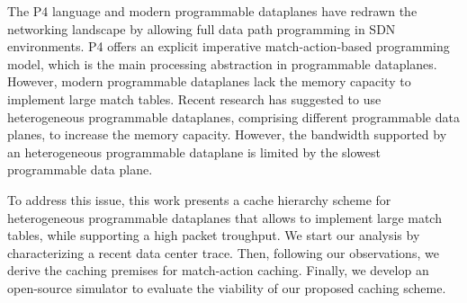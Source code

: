 The P4 language and modern programmable dataplanes have redrawn the networking landscape by allowing full data path programming in SDN environments.
P4 offers an explicit imperative match-action-based programming model, which is the main processing abstraction in programmable dataplanes.
However, modern programmable dataplanes lack the memory capacity to implement large match tables.
Recent research has suggested to use heterogeneous programmable dataplanes, comprising different programmable data planes, to increase the memory capacity. 
However, the bandwidth supported by an heterogeneous programmable dataplane is limited by the slowest programmable data plane. 

To address this issue, this work presents a cache hierarchy scheme for heterogeneous programmable dataplanes that allows to implement large match tables, while supporting a high packet troughput. 
We start our analysis by characterizing a recent data center trace.
Then, following our observations, we derive the caching premises for match-action caching.
Finally, we develop an open-source simulator to evaluate the viability of our proposed caching scheme.

